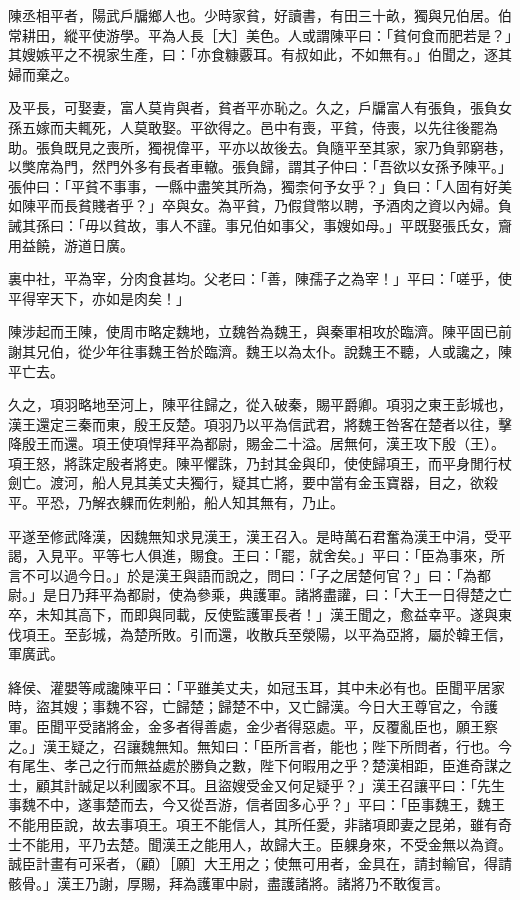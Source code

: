 
\begin{pinyinscope}
陳丞相平者，陽武戶牖鄉人也。少時家貧，好讀書，有田三十畝，獨與兄伯居。伯常耕田，縱平使游學。平為人長［大］美色。人或謂陳平曰：「貧何食而肥若是？」其嫂嫉平之不視家生產，曰：「亦食糠覈耳。有叔如此，不如無有。」伯聞之，逐其婦而棄之。

及平長，可娶妻，富人莫肯與者，貧者平亦恥之。久之，戶牖富人有張負，張負女孫五嫁而夫輒死，人莫敢娶。平欲得之。邑中有喪，平貧，侍喪，以先往後罷為助。張負既見之喪所，獨視偉平，平亦以故後去。負隨平至其家，家乃負郭窮巷，以獘席為門，然門外多有長者車轍。張負歸，謂其子仲曰：「吾欲以女孫予陳平。」張仲曰：「平貧不事事，一縣中盡笑其所為，獨柰何予女乎？」負曰：「人固有好美如陳平而長貧賤者乎？」卒與女。為平貧，乃假貸幣以聘，予酒肉之資以內婦。負誡其孫曰：「毋以貧故，事人不謹。事兄伯如事父，事嫂如母。」平既娶張氏女，齎用益饒，游道日廣。

裏中社，平為宰，分肉食甚均。父老曰：「善，陳孺子之為宰！」平曰：「嗟乎，使平得宰天下，亦如是肉矣！」

陳涉起而王陳，使周市略定魏地，立魏咎為魏王，與秦軍相攻於臨濟。陳平固已前謝其兄伯，從少年往事魏王咎於臨濟。魏王以為太仆。說魏王不聽，人或讒之，陳平亡去。

久之，項羽略地至河上，陳平往歸之，從入破秦，賜平爵卿。項羽之東王彭城也，漢王還定三秦而東，殷王反楚。項羽乃以平為信武君，將魏王咎客在楚者以往，擊降殷王而還。項王使項悍拜平為都尉，賜金二十溢。居無何，漢王攻下殷（王）。項王怒，將誅定殷者將吏。陳平懼誅，乃封其金與印，使使歸項王，而平身閒行杖劍亡。渡河，船人見其美丈夫獨行，疑其亡將，要中當有金玉寶器，目之，欲殺平。平恐，乃解衣躶而佐刺船，船人知其無有，乃止。

平遂至修武降漢，因魏無知求見漢王，漢王召入。是時萬石君奮為漢王中涓，受平謁，入見平。平等七人俱進，賜食。王曰：「罷，就舍矣。」平曰：「臣為事來，所言不可以過今日。」於是漢王與語而說之，問曰：「子之居楚何官？」曰：「為都尉。」是日乃拜平為都尉，使為參乘，典護軍。諸將盡讙，曰：「大王一日得楚之亡卒，未知其高下，而即與同載，反使監護軍長者！」漢王聞之，愈益幸平。遂與東伐項王。至彭城，為楚所敗。引而還，收散兵至滎陽，以平為亞將，屬於韓王信，軍廣武。

絳侯、灌嬰等咸讒陳平曰：「平雖美丈夫，如冠玉耳，其中未必有也。臣聞平居家時，盜其嫂；事魏不容，亡歸楚；歸楚不中，又亡歸漢。今日大王尊官之，令護軍。臣聞平受諸將金，金多者得善處，金少者得惡處。平，反覆亂臣也，願王察之。」漢王疑之，召讓魏無知。無知曰：「臣所言者，能也；陛下所問者，行也。今有尾生、孝己之行而無益處於勝負之數，陛下何暇用之乎？楚漢相距，臣進奇謀之士，顧其計誠足以利國家不耳。且盜嫂受金又何足疑乎？」漢王召讓平曰：「先生事魏不中，遂事楚而去，今又從吾游，信者固多心乎？」平曰：「臣事魏王，魏王不能用臣說，故去事項王。項王不能信人，其所任愛，非諸項即妻之昆弟，雖有奇士不能用，平乃去楚。聞漢王之能用人，故歸大王。臣躶身來，不受金無以為資。誠臣計畫有可采者，（顧）［願］大王用之；使無可用者，金具在，請封輸官，得請骸骨。」漢王乃謝，厚賜，拜為護軍中尉，盡護諸將。諸將乃不敢復言。


\end{pinyinscope}

